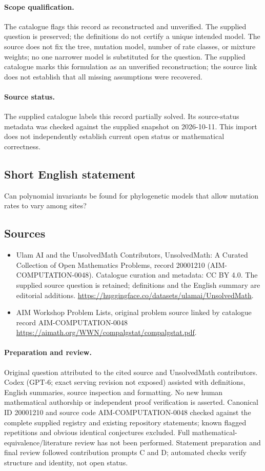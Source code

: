 \documentclass[11pt]{article}
\begin{document}
\paragraph{Scope qualification.}
The catalogue flags this record as reconstructed and unverified. The supplied question is preserved; the definitions do not certify a unique intended model. The source does not fix the tree, mutation model, number of rate classes, or mixture weights; no one narrower model is substituted for the question.
The supplied catalogue marks this formulation as an unverified reconstruction; the source link does not establish that all missing assumptions were recovered.
\paragraph{Source status.}
The supplied catalogue labels this record partially solved. Its source-status metadata was checked against the supplied snapshot on 2026-10-11. This import does not independently establish current open status or mathematical correctness.
\subsection{Short English statement}
Can polynomial invariants be found for phylogenetic models that allow mutation rates to vary among sites?
\subsection{Sources}
\begin{itemize}
\item[S1] Ulam AI and the UnsolvedMath Contributors, UnsolvedMath: A Curated Collection of Open Mathematics Problems, record 20001210 (AIM-COMPUTATION-0048). Catalogue curation and metadata: CC BY 4.0. The supplied source question is retained; definitions and the English summary are editorial additions.
\url{https://huggingface.co/datasets/ulamai/UnsolvedMath}.
\item[S2] AIM Workshop Problem Lists, original problem source linked by catalogue record AIM-COMPUTATION-0048
\url{https://aimath.org/WWN/compalgstat/compalgstat.pdf}.
\end{itemize}
\paragraph{Preparation and review.}
Original question attributed to the cited source and UnsolvedMath contributors. Codex (GPT-6; exact serving revision not exposed) assisted with definitions, English summaries, source inspection and formatting. No new human mathematical authorship or independent proof verification is asserted. Canonical ID 20001210 and source code AIM-COMPUTATION-0048 checked against the complete supplied registry and existing repository statements; known flagged repetitions and obvious identical conjectures excluded. Full mathematical-equivalence/literature review has not been performed. Statement preparation and final review followed contribution prompts C and D; automated checks verify structure and identity, not open status.
\label{end:20001210}
\end{document}
